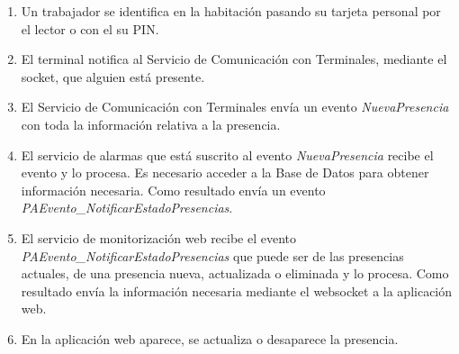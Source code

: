 \begin{enumerate}
	\item Un trabajador se identifica en la habitación pasando su tarjeta personal por el lector o con el su PIN.
	\item El terminal notifica al Servicio de Comunicación con Terminales, mediante el socket, que alguien está presente.
	\item El Servicio de Comunicación con Terminales envía un evento \textit{NuevaPresencia} con toda la información relativa a la presencia.
	\item El servicio de alarmas que está suscrito al evento \textit{NuevaPresencia} recibe el evento y lo procesa. Es necesario acceder a la Base de Datos para obtener información necesaria. Como resultado envía un evento \textit{PAEvento\_NotificarEstadoPresencias}.
	\item El servicio de monitorización web recibe el evento \textit{PAEvento\_NotificarEstadoPresencias} que puede ser de las presencias actuales, de una presencia nueva, actualizada o eliminada y lo procesa. Como resultado envía la información necesaria mediante el websocket a la aplicación web.
	\item En la aplicación web aparece, se actualiza o desaparece la presencia.
\end{enumerate}


